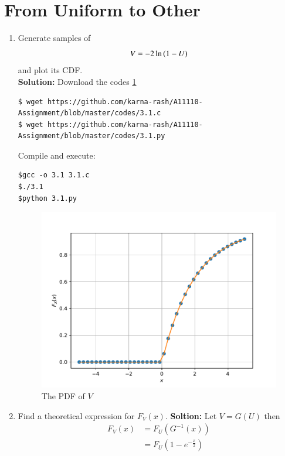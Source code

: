 \documentclass[journal,12pt,twocolumn]{IEEEtran}
\renewcommand\thesection{\arabic{section}}
\begin{document}
\section{From Uniform to Other}
\begin{enumerate}[label=\thesection.\arabic*
,ref=\thesection.\theenumi]
%
\item
Generate samples of 
%
\begin{equation}
V = -2\ln\left(1-U\right)
\end{equation}
%
and plot its CDF.\\
\textbf{Solution:}
Download the codes \ref{fig:vni_cdf}
\begin{lstlisting}
$ wget https://github.com/karna-rash/A11110-Assignment/blob/master/codes/3.1.c
$ wget https://github.com/karna-rash/A11110-Assignment/blob/master/codes/3.1.py
\end{lstlisting}
Compile and execute:
\begin{lstlisting}
$gcc -o 3.1 3.1.c
$./3.1
$python 3.1.py
\end{lstlisting}
\begin{figure}
\centering
\includegraphics[width=\columnwidth]{./figs/vni_cdf}
\caption{The PDF of $V$}
\label{fig:vni_cdf}
\end{figure}
\item Find a theoretical expression for $F_V(x)$.
\textbf{Soltion:}
Let $V=G(U)$ then
\begin{align}
F_V(x)&=F_U(G^{-1}(x))\\
&=F_U(1-e^{-\frac{x}{2}}) \\
\end{align}
\begin{equation}

\end{equation}
\end{enumerate}
\end{document}
